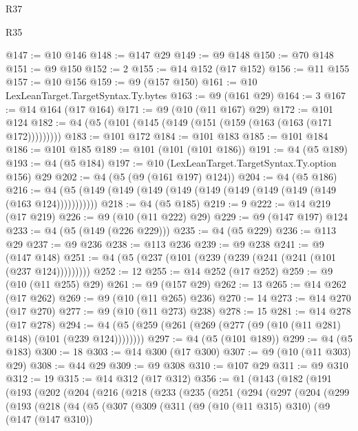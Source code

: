 \begin{lexlean}{R37}
\begin{lexlean}{R35}
\begin{coremodule}
{{{{{{{{{{{{{{{{{{{{{{{{{{{{{{{{{{{{{{{{{{{{{{{{{{{{@147 := @10 @146
@148 := @147 @29
@149 := @9 @148
@150 := @70 @148
@151 := @9 @150
@152 := 2
@155 := @14 @152 (@17 @152)
@156 := @11 @155
@157 := @10 @156
@159 := @9 (@157 @150)
@161 := @10 LexLeanTarget.TargetSyntax.Ty.bytes
@163 := @9 (@161 @29)
@164 := 3
@167 := @14 @164 (@17 @164)
@171 := @9 (@10 (@11 @167) @29)
@172 := @101 @124
@182 := @4 (@5 (@101 (@145 (@149 (@151 (@159 (@163 (@163 (@171 @172)))))))))
@183 := @101 @172
@184 := @101 @183
@185 := @101 @184
@186 := @101 @185
@189 := @101 (@101 (@101 @186))
@191 := @4 (@5 @189)
@193 := @4 (@5 @184)
@197 := @10 (LexLeanTarget.TargetSyntax.Ty.option @156) @29
@202 := @4 (@5 (@9 (@161 @197) @124))
@204 := @4 (@5 @186)
@216 := @4 (@5 (@149 (@149 (@149 (@149 (@149 (@149 (@149 (@149 (@149 (@163 @124)))))))))))
@218 := @4 (@5 @185)
@219 := 9
@222 := @14 @219 (@17 @219)
@226 := @9 (@10 (@11 @222) @29)
@229 := @9 (@147 @197) @124
@233 := @4 (@5 (@149 (@226 @229)))
@235 := @4 (@5 @229)
@236 := @113 @29
@237 := @9 @236
@238 := @113 @236
@239 := @9 @238
@241 := @9 (@147 @148)
@251 := @4 (@5 (@237 (@101 (@239 (@239 (@241 (@241 (@101 (@237 @124)))))))))
@252 := 12
@255 := @14 @252 (@17 @252)
@259 := @9 (@10 (@11 @255) @29)
@261 := @9 (@157 @29)
@262 := 13
@265 := @14 @262 (@17 @262)
@269 := @9 (@10 (@11 @265) @236)
@270 := 14
@273 := @14 @270 (@17 @270)
@277 := @9 (@10 (@11 @273) @238)
@278 := 15
@281 := @14 @278 (@17 @278)
@294 := @4 (@5 (@259 (@261 (@269 (@277 (@9 (@10 (@11 @281) @148) (@101 (@239 @124))))))))
@297 := @4 (@5 (@101 @189))
@299 := @4 (@5 @183)
@300 := 18
@303 := @14 @300 (@17 @300)
@307 := @9 (@10 (@11 @303) @29)
@308 := @44 @29
@309 := @9 @308
@310 := @107 @29
@311 := @9 @310
@312 := 19
@315 := @14 @312 (@17 @312)
@356 := @1
    (@143
      (@182
        (@191
          (@193
            (@202
              (@204
                (@216
                  (@218
                    (@233
                      (@235
                        (@251
                          (@294
                            (@297
                              (@204
                                (@299
                                  (@193
                                    (@218
                                      (@4
                                        (@5
                                          (@307
                                            (@309
                                              (@311
                                                (@9
                                                  (@10 (@11 @315) @310)
                                                  (@9
                                                    (@147 (@147 @310))
}}}}}}}}}}}}}}}}}}}}}}}}}}}}}}}}}}}}}}}}}}}}}}}}}}}}
\end{coremodule}
\end{lexlean}
\end{lexlean}
